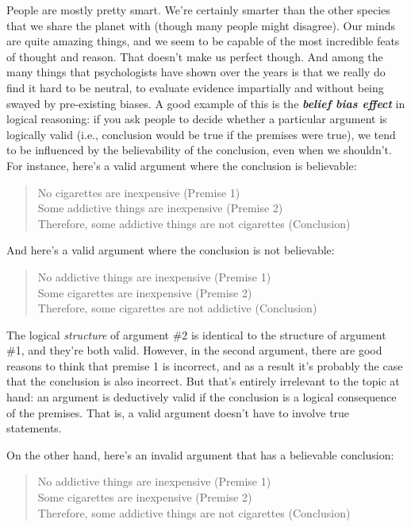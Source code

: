 \documentclass[]{book}
\begin{document}
People are mostly pretty smart. We're certainly smarter than the other species that we share the planet with (though many people might disagree). Our minds are quite amazing things, and we seem to be capable of the most incredible feats of thought and reason. That doesn't make us perfect though. And among the many things that psychologists have shown over the years is that we really do find it hard to be neutral, to evaluate evidence impartially and without being swayed by pre-existing biases. A good example of this is the \textbf{\emph{belief bias effect}} in logical reasoning: if you ask people to decide whether a particular argument is logically valid (i.e., conclusion would be true if the premises were true), we tend to be influenced by the believability of the conclusion, even when we shouldn't. For instance, here's a valid argument where the conclusion is believable:

\begin{quote}
No cigarettes are inexpensive (Premise 1)\\
Some addictive things are inexpensive (Premise 2)\\
Therefore, some addictive things are not cigarettes (Conclusion)
\end{quote}

And here's a valid argument where the conclusion is not believable:

\begin{quote}
No addictive things are inexpensive (Premise 1)\\
Some cigarettes are inexpensive (Premise 2)\\
Therefore, some cigarettes are not addictive (Conclusion)
\end{quote}

The logical \emph{structure} of argument \#2 is identical to the structure of argument \#1, and they're both valid. However, in the second argument, there are good reasons to think that premise 1 is incorrect, and as a result it's probably the case that the conclusion is also incorrect. But that's entirely irrelevant to the topic at hand: an argument is deductively valid if the conclusion is a logical consequence of the premises. That is, a valid argument doesn't have to involve true statements.

On the other hand, here's an invalid argument that has a believable conclusion:

\begin{quote}
No addictive things are inexpensive (Premise 1)\\
Some cigarettes are inexpensive (Premise 2)\\
Therefore, some addictive things are not cigarettes (Conclusion)
\end{quote}
\end{document}
